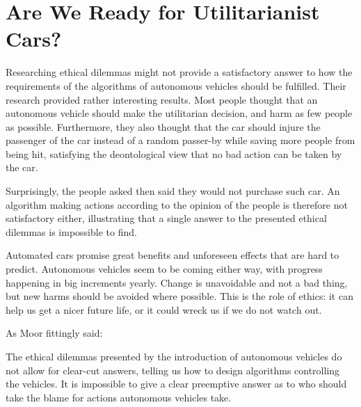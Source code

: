 \section{Are We Ready for Utilitarianist Cars?}
Researching ethical dilemmas might not provide a satisfactory answer to how the requirements of the algorithms of autonomous vehicles should be fulfilled. \cite{DBLP:journals/corr/BonnefonSR15}
Their research provided rather interesting results. Most people thought that an autonomous vehicle should make the utilitarian decision, and harm as few people as possible. Furthermore, they also thought that the car should injure the passenger of the car instead of a random passer-by while saving more people from being hit, satisfying the deontological view that no bad action can be taken by the car. 

Surprisingly, the people asked then said they would not purchase such car. An algorithm making actions according to the opinion of the people is therefore not satisfactory either, illustrating that a single answer to the presented ethical dilemmas is impossible to find. 

Automated cars promise great benefits and unforeseen effects that are hard to predict. Autonomous vehicles seem to be coming either way, with progress happening in big increments yearly. Change is unavoidable and not a bad thing, but new harms should be avoided where possible. This is the role of ethics: it can help us get a nicer future life, or it could wreck us if we do not watch out.

As Moor fittingly said: 
\begin{quote}
\end{quote}

The ethical dilemmas presented by the introduction of autonomous vehicles do not allow for clear-cut answers, telling us how to design algorithms controlling the vehicles. It is impossible to give a clear preemptive answer as to who should take the blame for actions autonomous vehicles take.

